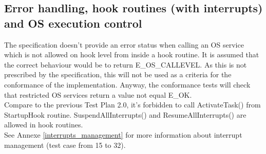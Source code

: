 \documentclass[10pt]{article}
\begin{document}
	\subsection{Error handling, hook routines (with interrupts) and OS execution control}
	The specification doesn’t provide an error status when calling an OS service which is not allowed on hook level from inside a hook routine. It is assumed that the correct behaviour would be to return E\_OS\_CALLEVEL. As this is not prescribed by the specification, this will not be used as a criteria for the conformance of the implementation. Anyway, the conformance tests will check that restricted OS services return a value not equal E\_OK.\\
	Compare to the previous Test Plan 2.0, it's forbidden to call ActivateTask() from StartupHook routine. SuspendAllInterrupts() and ResumeAllInterrupts() are allowed in hook routines.\\
	See Annexe \ref{interrupts_management} for more information about interrupt management (test case from 15 to 32).\\
	
\end{document}
